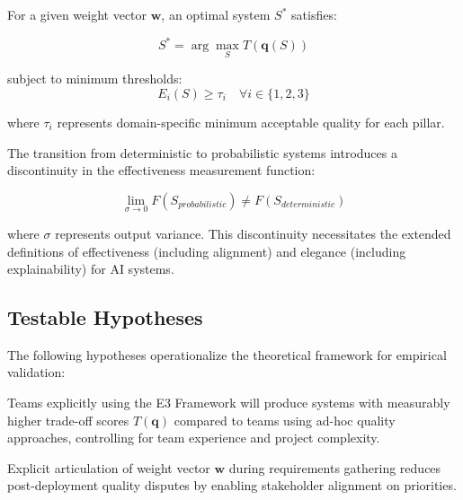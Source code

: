 \begin{proposition}
\label{prop:pareto}
For a given weight vector $\mathbf{w}$, an optimal system $S^*$ satisfies:

\begin{equation}
S^* = \arg\max_{S} T(\mathbf{q}(S))
\end{equation}

subject to minimum thresholds:
\begin{equation}
E_i(S) \geq \tau_i \quad \forall i \in \{1, 2, 3\}
\end{equation}

where $\tau_i$ represents domain-specific minimum acceptable quality for each pillar.
\end{proposition}

\begin{proposition}
\label{prop:transition}
The transition from deterministic to probabilistic systems introduces a discontinuity in the effectiveness measurement function:

\begin{equation}
\lim_{\sigma \rightarrow 0} F(S_{probabilistic}) \neq F(S_{deterministic})
\end{equation}

where $\sigma$ represents output variance. This discontinuity necessitates the extended definitions of effectiveness (including alignment) and elegance (including explainability) for AI systems.
\end{proposition}

\subsection{Testable Hypotheses}

The following hypotheses operationalize the theoretical framework for empirical validation:

\begin{hypothesis}
\label{hyp:adoption}
Teams explicitly using the E3 Framework will produce systems with measurably higher trade-off scores $T(\mathbf{q})$ compared to teams using ad-hoc quality approaches, controlling for team experience and project complexity.
\end{hypothesis}

\begin{hypothesis}
\label{hyp:awareness}
Explicit articulation of weight vector $\mathbf{w}$ during requirements gathering reduces post-deployment quality disputes by enabling stakeholder alignment on priorities.
\end{hypothesis}

